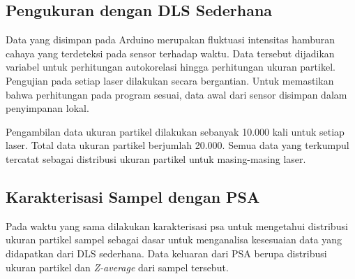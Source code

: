 \subsection{Pengukuran dengan DLS Sederhana}
Data yang disimpan pada Arduino merupakan fluktuasi intensitas hamburan cahaya yang terdeteksi
pada sensor terhadap waktu. Data tersebut dijadikan variabel untuk perhitungan autokorelasi
hingga perhitungan ukuran partikel. Pengujian pada setiap laser dilakukan secara bergantian.
Untuk memastikan bahwa perhitungan pada program sesuai, data awal dari sensor disimpan dalam
penyimpanan lokal.

Pengambilan data ukuran partikel dilakukan sebanyak 10.000 kali untuk setiap laser. Total data
ukuran partikel berjumlah 20.000. Semua data yang terkumpul tercatat sebagai distribusi
ukuran partikel untuk masing-masing laser.

\subsection{Karakterisasi Sampel dengan PSA}
Pada waktu yang sama dilakukan karakterisasi psa untuk mengetahui distribusi ukuran partikel
sampel sebagai dasar untuk menganalisa kesesuaian data yang didapatkan dari DLS sederhana.
Data keluaran dari PSA berupa distribusi ukuran partikel dan \textit{Z-average} dari sampel
tersebut.